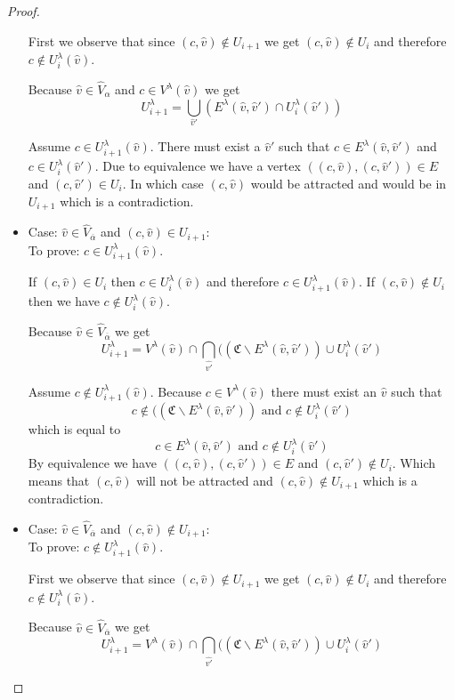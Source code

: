 \begin{lemma}
\begin{proof}
\begin{itemize}
			
			First we observe that since $(c, \hat{v}) \notin U_{i+1}$ we get $(c, \hat{v}) \notin U_{i}$ and therefore $c \notin U^\lambda_i(\hat{v})$.
			
			Because $\hat{v} \in \hat{V}_{\alpha}$ and $c \in V^\lambda(\hat{v})$ we get
\[ U^\lambda_{i+1} =\bigcup_{\hat{v}'} (E^\lambda(\hat{v},\hat{v}') \cap U^\lambda_i(\hat{v}')) \]
			
			Assume $c \in U^\lambda_{i+1}(\hat{v})$. There must exist a $\hat{v}'$ such that $c \in E^\lambda(\hat{v},\hat{v}')$ and $c \in U^\lambda_i(\hat{v}')$. Due to equivalence we have a vertex $((c,\hat{v}),(c,\hat{v}')) \in E$ and $(c,\hat{v}') \in U_i$. In which case $(c,\hat{v})$ would be attracted and would be in $U_{i+1}$ which is a contradiction.
			\item Case: $\hat{v} \in \hat{V}_{\overline{\alpha}}$ and $(c,\hat{v}) \in U_{i+1}$:\\
			To prove: $c \in U^\lambda_{i+1}(\hat{v})$.
			
			If $(c,\hat{v}) \in U_i$ then $c \in U^\lambda_i(\hat{v})$ and therefore $c \in U^\lambda_{i+1}(\hat{v})$. If $(c,\hat{v}) \notin U_i$ then we have $c \notin U^\lambda_i(\hat{v})$.
			
			Because $\hat{v} \in \hat{V}_{\overline{\alpha}}$ we get
			\[ U^\lambda_{i+1} =V^\lambda(\hat{v}) \cap \bigcap_{\hat{v'}}((\mathfrak{C} \backslash E^\lambda(\hat{v},\hat{v}')) \cup U^\lambda_i(\hat{v}') \]
			
			Assume $c \notin U^\lambda_{i+1}(\hat{v})$. Because $c \in V^\lambda(\hat{v})$ there must exist an $\hat{v}$ such that
			\[ c \notin ((\mathfrak{C} \backslash E^\lambda(\hat{v},\hat{v}')) \text{ and } c \notin U^\lambda_i(\hat{v}') \]
			which is equal to
			\[ c \in E^\lambda(\hat{v},\hat{v}') \text{ and } c \notin U^\lambda_i(\hat{v}') \]
			By equivalence we have $((c,\hat{v}),(c,\hat{v}')) \in E$ and $(c,\hat{v}') \notin U_i$. Which means that $(c,\hat{v})$ will not be attracted and $(c,\hat{v}) \notin U_{i+1}$ which is a contradiction.
			\item Case: $\hat{v} \in \hat{V}_{\overline{\alpha}}$ and $(c,\hat{v}) \notin U_{i+1}$:\\
			To prove: $c \notin U^\lambda_{i+1}(\hat{v})$.
			
			First we observe that since $(c, \hat{v}) \notin U_{i+1}$ we get $(c, \hat{v}) \notin U_{i}$ and therefore $c \notin U^\lambda_i(\hat{v})$.
			
			Because $\hat{v} \in \hat{V}_{\overline{\alpha}}$ we get
			\[ U^\lambda_{i+1} =V^\lambda(\hat{v}) \cap \bigcap_{\hat{v'}}((\mathfrak{C} \backslash E^\lambda(\hat{v},\hat{v}')) \cup U^\lambda_i(\hat{v}') \]
			

\end{itemize}
\end{proof}
\end{lemma}
